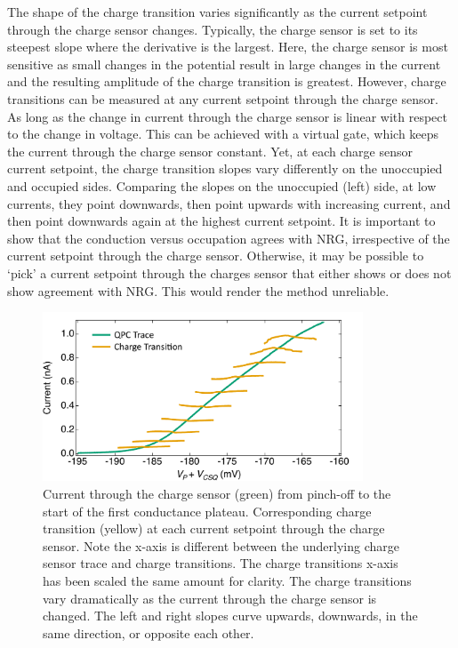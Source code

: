 The shape of the charge transition varies significantly as the current setpoint through the charge sensor changes. Typically, the charge sensor is set to its steepest slope where the derivative is the largest. Here, the charge sensor is most sensitive as small changes in the potential result in large changes in the current and the resulting amplitude of the charge transition is greatest. However, charge transitions can be measured at any current setpoint through the charge sensor. As long as the change in current through the charge sensor is linear with respect to the change in voltage. This can be achieved with a virtual gate, which keeps the current through the charge sensor constant. Yet, at each charge sensor current setpoint, the charge transition slopes vary differently on the unoccupied and occupied sides. Comparing the slopes on the unoccupied (left) side, at low currents, they point downwards, then point upwards with increasing current, and then point downwards again at the highest current setpoint. It is important to show that the conduction versus occupation agrees with NRG, irrespective of the current setpoint through the charge sensor. Otherwise, it may be possible to `pick' a current setpoint through the charges sensor that either shows or does not show agreement with NRG. This would render the method unreliable. 

\begin{figure}[!bht]
 \begin{center}
 \includegraphics[width=0.85\textwidth]{figures/ch3/figure16.pdf}
 \caption[Varying Charge Sensor Current Setpoint]{\label{fig:ch3/cond_occ_ct_set-points} 
 Current through the charge sensor (green) from pinch-off to the start of the first conductance plateau. Corresponding charge transition (yellow) at each current setpoint through the charge sensor. Note the x-axis is different between the underlying charge sensor trace and charge transitions. The charge transitions x-axis has been scaled the same amount for clarity. The charge transitions vary dramatically as the current through the charge sensor is changed. The left and right slopes curve upwards, downwards, in the same direction, or opposite each other.}
 \end{center}
\end{figure}


